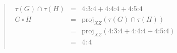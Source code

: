 \documentclass[12pt]{article}
\begin{document}
\begin{quote}$\begin{array}{cll}
\tau(G) \cap \tau(H) & = & 4\mbox{:}3\mbox{:}4 + 4\mbox{:}4\mbox{:}4 + 4\mbox{:}5\mbox{:}4 \\
G \circ H & = & \mbox{proj}_{XZ}(\tau(G) \cap \tau(H)) \\
          & = & \mbox{proj}_{XZ}(4\mbox{:}3\mbox{:}4 + 4\mbox{:}4\mbox{:}4 + 4\mbox{:}5\mbox{:}4) \\
          & = & 4:4 \\
\end{array}$\end{quote}

\end{document}
